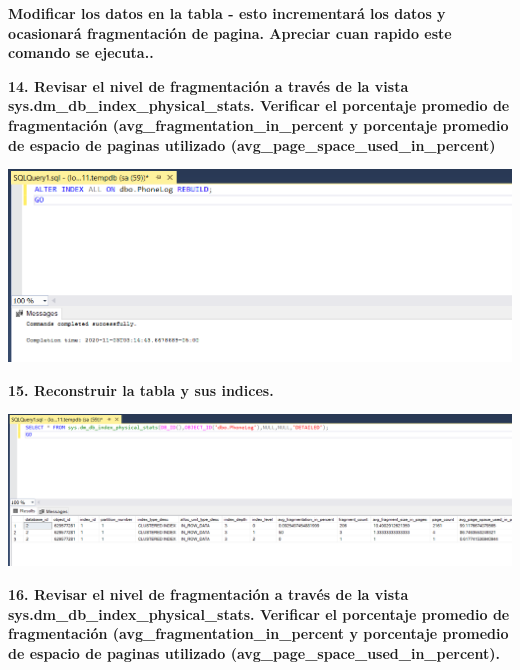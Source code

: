 \documentclass{article}
\begin{document}
\textbf{Modificar los datos en la tabla - esto incrementará los datos y ocasionará fragmentación de pagina. Apreciar cuan rapido este comando se ejecuta..}


\textbf{14. Revisar el nivel de fragmentación a través de la vista sys.dm_db_index_physical_stats. Verificar el porcentaje promedio de fragmentación (avg_fragmentation_in_percent y porcentaje promedio de espacio de paginas utilizado (avg_page_space_used_in_percent)}

    \begin{center}
		\includegraphics[width=15cm]{./images/18} 
	\end{center}

\textbf{15. Reconstruir la tabla y sus indices.}

    \begin{center}
		\includegraphics[width=15cm]{./images/19} 
	\end{center}
	\newpage
\textbf{16. Revisar el nivel de fragmentación a través de la vista sys.dm_db_index_physical_stats. Verificar el porcentaje promedio de fragmentación (avg_fragmentation_in_percent y porcentaje promedio de espacio de paginas utilizado (avg_page_space_used_in_percent).}
\end{document}
